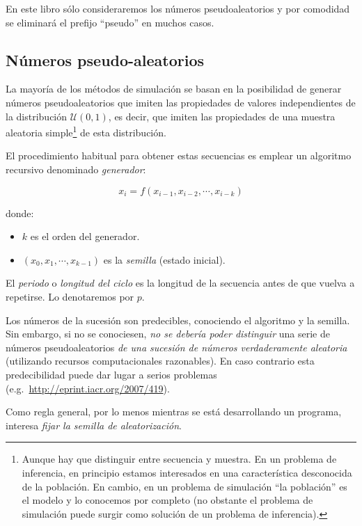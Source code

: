 \documentclass[
  10pt,
]{book}
\theoremstyle{break}
\theoremstyle{nonumberplain}
\let\oldfootnote\footnote
\renewcommand\footnote[1]{\oldfootnote{\hspace{2mm}#1}}
\begin{document}
En este libro sólo consideraremos los números pseudoaleatorios y por comodidad se eliminará el prefijo ``pseudo'' en muchos casos.

\hypertarget{nuxfameros-pseudo-aleatorios}{%
\subsection{Números pseudo-aleatorios}\label{nuxfameros-pseudo-aleatorios}}

La mayoría de los métodos de simulación se basan en la posibilidad de generar números pseudoaleatorios que imiten las propiedades de valores independientes de la distribución \(\mathcal{U}(0,1)\), es decir, que imiten las propiedades de una muestra aleatoria simple\footnote{Aunque hay que distinguir entre secuencia y muestra. En un problema de inferencia, en principio estamos interesados en una característica desconocida de la población. En cambio, en un problema de simulación ``la población'' es el modelo y lo conocemos por completo (no obstante el problema de simulación puede surgir como solución de un problema de inferencia).} de esta distribución.

El procedimiento habitual para obtener estas secuencias es emplear un algoritmo recursivo denominado \emph{generador}:

\[x_{i} = f\left( x_{i-1}, x_{i-2}, \cdots, x_{i-k}\right)\]

donde:

\begin{itemize}
\item
  \(k\) es el orden del generador.
\item
  \(\left( x_{0},x_{1},\cdots,x_{k-1}\right)\) es la \emph{semilla}
  (estado inicial).
\end{itemize}

El \emph{periodo} o \emph{longitud del ciclo} es la longitud de la secuencia antes de que vuelva a repetirse. Lo denotaremos por \(p\).

Los números de la sucesión son predecibles, conociendo el algoritmo y la semilla.
Sin embargo, si no se conociesen, \emph{no se debería poder distinguir} una serie de números pseudoaleatorios \emph{de una sucesión de números verdaderamente aleatoria} (utilizando recursos computacionales razonables).
En caso contrario esta predecibilidad puede dar lugar a serios
problemas (e.g.~\url{http://eprint.iacr.org/2007/419}).

Como regla general, por lo menos mientras se está desarrollando un
programa, interesa \emph{fijar la semilla de aleatorización}.
\end{document}
